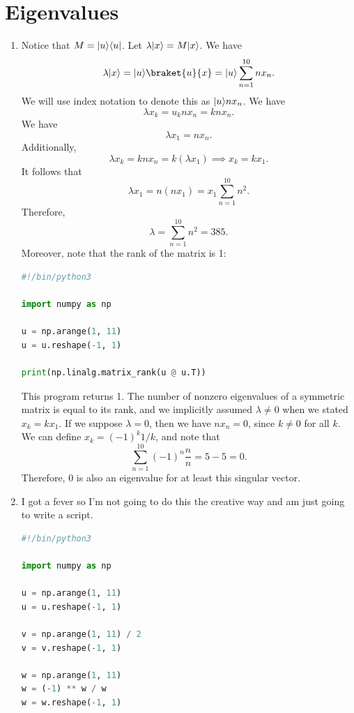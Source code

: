 \documentclass[11pt, letterpaper]{article}
\begin{document}
\section{Eigenvalues}
\begin{enumerate}
	\item Notice that $M= \lvert u\rangle \langle u\rvert$. Let $\lambda \lvert x\rangle = M \lvert x\rangle $. We have
		\[
			\lambda \ket{x} = \ket{u} \braket{u}{x} = \ket{u} \sum_{n=1}^{10} nx_n
		.\]
		We will use index notation to denote this as $\lvert u\rangle nx_n $. We have
		\[
			\lambda x_k = u_k nx_n = knx_n
		.\]
		We have
		\[
			\lambda x_1 = nx_n
		.\]
		Additionally,
		\[
			\lambda x_k = knx_n = k(\lambda x_1) \implies x_k = kx_1
		.\]
		It follows that
		\[
			\lambda x_1 = n(nx_1)=x_1\sum_{n=1}^{10}n^2
		.\]
		Therefore,
		\[
			\lambda = \sum_{n=1}^{10} n^2 = 385
		.\]
		Moreover, note that the rank of the matrix is 1:
		\begin{lstlisting}[language=Python]		
#!/bin/python3

import numpy as np

u = np.arange(1, 11)
u = u.reshape(-1, 1)

print(np.linalg.matrix_rank(u @ u.T))
\end{lstlisting}
This program returns 1. The number of nonzero eigenvalues of a symmetric matrix is equal to its rank, and we implicitly assumed $\lambda \neq 0$ when we stated $x_k=kx_1$. If we suppose $\lambda =0$, then we have $nx_n=0$, since $k\neq 0$ for all $k$. We can define $x_k = (-1)^k1/k$, and note that
\[
	\sum_{n=1}^{10} (-1)^n\frac{n}{n}=5-5=0
.\]
Therefore, $0$ is also an eigenvalue for at least this singular vector.
\item I got a fever so I'm not going to do this the creative way and am just going to write a script.
	\begin{lstlisting}[language=Python]
#!/bin/python3

import numpy as np

u = np.arange(1, 11)
u = u.reshape(-1, 1)

v = np.arange(1, 11) / 2
v = v.reshape(-1, 1)

w = np.arange(1, 11)
w = (-1) ** w / w
w = w.reshape(-1, 1)


\end{lstlisting}
\end{enumerate}
\end{document}
